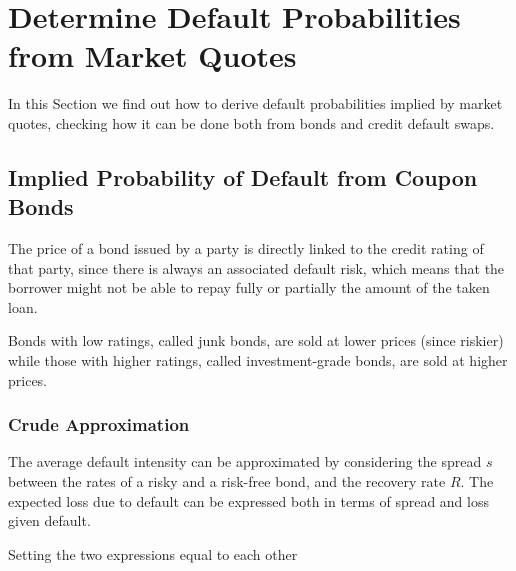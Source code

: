 %

\section{Determine Default Probabilities from Market Quotes}
In this Section we find out how to derive default probabilities implied by market quotes, checking how it can be done both from bonds and credit default swaps.

\subsection{Implied Probability of Default from Coupon Bonds}\label{default-probabilities-and-bond-prices}

The price of a bond issued by a party is directly linked to the credit rating of that party, since there is always an associated default risk, which means that the borrower might not be able to repay fully or partially the amount of the taken loan. 

Bonds with low ratings, called junk bonds, are sold at lower prices (since riskier) while those with higher ratings, called investment-grade bonds, are sold at higher prices.

\subsubsection{Crude Approximation}

The average default intensity can be approximated by considering the spread $s$ between the rates of a risky and a risk-free bond, and the recovery rate $R$.
The expected loss due to default can be expressed both in terms of spread and loss given default. 

Setting the two expressions equal to each other

